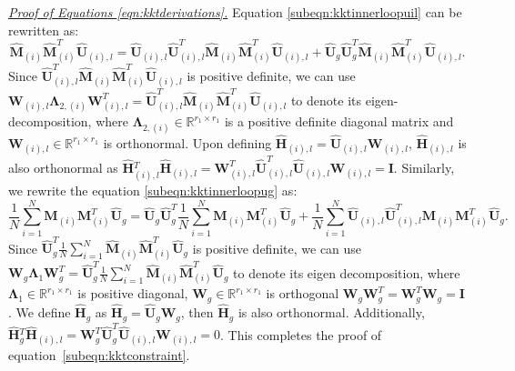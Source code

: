 \documentclass[twoside,11pt]{article}
\newcommand{\hmatH}{{\hat{\mathbf{H}}}{}}
\newcommand{\matI}{\mathbf{I}}
\newcommand{\matM}{\mathbf{M}}
\newcommand{\matLambda}{\mathbf{\Lambda}}
\newcommand{\matW}{\mathbf{W}}
\newcommand{\hmatM}{\hat{\mathbf{M}}}
\newcommand{\hmatU}{\hat{\mathbf{U}}}
\begin{document}
\noindent \underline{\it Proof of Equations \eqref{eqn:kktderivations}.} Equation \eqref{subeqn:kktinnerloopuil} can be rewritten as:
\begin{equation}
\label{eqn:mmtuiexpansion}
\hmatM_{(i)}\hmatM_{(i)}^T\hmatU_{(i),l} = \hmatU_{(i),l}\hmatU_{(i),l}^T\hmatM_{(i)}\hmatM_{(i)}^T\hmatU_{(i),l}+\hmatU_{g}\hmatU_{g}^T\hmatM_{(i)}\hmatM_{(i)}^T\hmatU_{(i),l}.  
\end{equation}
Since $\hmatU_{(i),l}^T\hmatM_{(i)}\hmatM_{(i)}^T\hmatU_{(i),l}$ is positive definite, we can use $\matW_{(i),l}\matLambda_{2,(i)}\matW_{(i),l}^T=\hmatU_{(i),l}^T\hmatM_{(i)}\hmatM_{(i)}^T\hmatU_{(i),l}$ to denote its eigen-decomposition, where $\matLambda_{2,(i)}\in \mathbb{R}^{r_1\times r_1}$ is a positive definite diagonal matrix and $\matW_{(i),l}\in \mathbb{R}^{r_1\times r_1}$ is orthonormal. Upon defining $\hmatH_{(i),l}=\hmatU_{(i),l}\matW_{(i),l}$, $\hmatH_{(i),l}$ is also orthonormal as $\hmatH_{(i),l}^T\hmatH_{(i),l}=\matW_{(i),l}^T\hmatU_{(i),l}^T\hmatU_{(i),l}\matW_{(i),l}=\matI$. 
Similarly, we rewrite the equation \eqref{subeqn:kktinnerloopug} as:
\begin{equation}
\label{eqn:mmtugexpansion}
\frac{1}{N}\sum_{i=1}^N\matM_{(i)}\matM_{(i)}^T\hmatU_g = \hmatU_g\hmatU_g^T \frac{1}{N}\sum_{i=1}^N\matM_{(i)}\matM_{(i)}^T\hmatU_g +\frac{1}{N}\sum_{i=1}^N\hmatU_{(i),l}\hmatU_{(i),l}^T\matM_{(i)}\matM_{(i)}^T\hmatU_g. 
\end{equation}
Since $\hmatU_g^T \frac{1}{N}\sum_{i=1}^N\hmatM_{(i)}\hmatM_{(i)}^T\hmatU_g$ is positive definite, we can use $\matW_{g}\matLambda_{1}\matW_{g}^T=\hmatU_g^T \frac{1}{N}\sum_{i=1}^N\hmatM_{(i)}\hmatM_{(i)}^T\hmatU_g$ to denote its eigen decomposition, where $\matLambda_{1}\in \mathbb{R}^{r_1\times r_1}$ is positive diagonal, $\matW_{g}\in \mathbb{R}^{r_1\times r_1}$ is orthogonal $\matW_{g}\matW_{g}^T=\matW_{g}^T\matW_{g}=\matI$. 
We define $\hmatH_g$ as $\hmatH_g=\hmatU_{g}\matW_{g}$, then $\hmatH_g$ is also orthonormal. Additionally, $\hmatH_g^T\hmatH_{(i),l}=\matW_g^T\hmatU_g^T\hmatU_{(i),l}\matW_{(i),l}=0$. This completes the proof of equation~\eqref{subeqn:kktconstraint}. 
\end{document}

